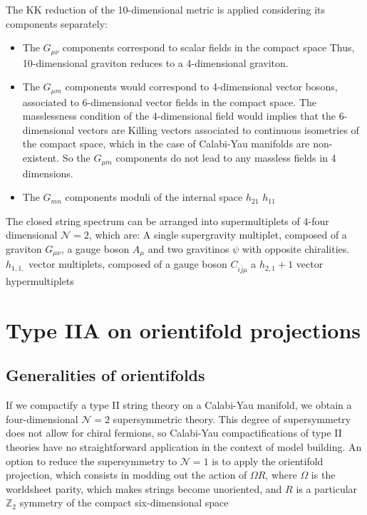 The KK reduction of the 10-dimensional metric is applied considering its components separately:
\begin{itemize}
  \item The $G_{\mu\nu}$ components correspond to scalar fields in the compact space
    Thus, 10-dimensional graviton reduces to a 4-dimensional graviton.
  \item The $G_{\mu m}$ components would correspond to 4-dimensional vector bosons, associated
    to 6-dimensional vector fields in the compact space. 
    The masslessness condition of the 4-dimensional field would implies that the 6-dimensional 
    vectors are Killing vectors associated to continuous isometries of the compact space, which
    in the case of Calabi-Yau manifolds are non-existent.
    So the $G_{\mu m}$ components do not lead to any massless fields in 4 dimensions.
  \item The $G_{m n}$ components
    moduli of the internal space
    $h_{21}$ $h_{11}$
\end{itemize}

The closed string spectrum can be arranged into supermultiplets of 4-four dimensional $\mathcal N=2$,
which are:
A single supergravity multiplet, composed of a graviton $G_{\mu\nu}$, a gauge boson $A_\mu$ and two gravitinos $\psi$ with opposite chiralities. 
$h_{1,1,}$ vector multiplets, composed of a gauge boson $C_{i\bar j\mu}$ a
$h_{2,1}+1$ vector hypermultiplets

\section{Type IIA on orientifold projections}

\subsection{Generalities of orientifolds}
If we compactify a type II string theory on a Calabi-Yau manifold, we  obtain a four-dimensional
$\mathcal N=2$ supersymmetric theory.
This degree of supersymmetry does not allow for chiral fermions, so Calabi-Yau compactifications
of type II theories have no straightforward application in the context of model building.
An option to reduce the supersymmetry to $\mathcal N=1$  is to apply the orientifold
projection, which consists in modding out the action of $\Omega R$,
where $\Omega$ is the worldsheet parity, which makes strings become unoriented, and
$R$ is a particular $\mathbb Z_2$ symmetry of the compact six-dimensional space

